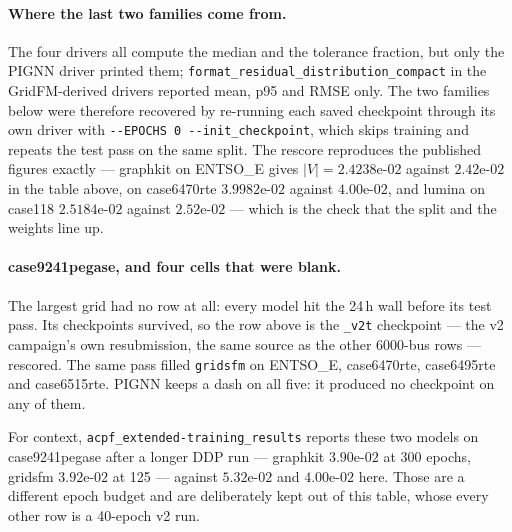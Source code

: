 \documentclass[10pt]{article}
\begin{document}
\paragraph{Where the last two families come from.} The four drivers all compute
the median and the tolerance fraction, but only the PIGNN driver printed them;
\texttt{format\_residual\_distribution\_compact} in the GridFM-derived drivers
reported mean, p95 and RMSE only. The two families below were therefore
recovered by re-running each saved checkpoint through its own driver with
\texttt{-{}-EPOCHS 0 -{}-init\_checkpoint}, which skips training and repeats the
test pass on the same split. The rescore reproduces the published figures
exactly --- graphkit on ENTSO\_E gives $|V|=2.4238\text{e-}02$ against
$2.42\text{e-}02$ in the table above, on case6470rte $3.9982\text{e-}02$ against
$4.00\text{e-}02$, and lumina on case118 $2.5184\text{e-}02$ against
$2.52\text{e-}02$ --- which is the check that the split and the weights line up.

\paragraph{case9241pegase, and four cells that were blank.} The largest grid had
no row at all: every model hit the 24\,h wall before its test pass. Its
checkpoints survived, so the row above is the \texttt{\_v2t} checkpoint --- the
v2 campaign's own resubmission, the same source as the other 6000-bus rows ---
rescored. The same pass filled \texttt{gridsfm} on ENTSO\_E, case6470rte,
case6495rte and case6515rte. PIGNN keeps a dash on all five: it produced no
checkpoint on any of them.

For context, \texttt{acpf\_extended-training\_results} reports these two models
on case9241pegase after a longer DDP run --- graphkit $3.90\text{e-}02$ at 300
epochs, gridsfm $3.92\text{e-}02$ at 125 --- against $5.32\text{e-}02$ and
$4.00\text{e-}02$ here. Those are a different epoch budget and are deliberately
kept out of this table, whose every other row is a 40-epoch v2 run.
\end{document}
